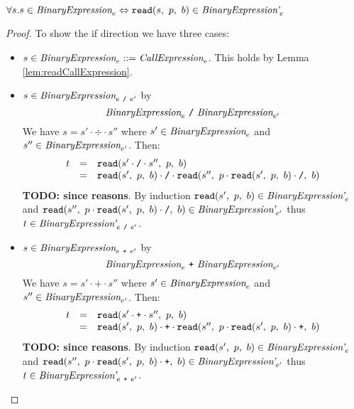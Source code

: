 \documentclass[preprint,10pt]{sigplanconf}
\begin{document}
\begin{lemma}\mbox{}
  
  \( \forall s. s \in \textit{BinaryExpression}_{e} \Leftrightarrow 
  \texttt{read}(s,~p,~b) \in \textit{BinaryExpression'}_{e} \)
\end{lemma}
\begin{proof}
  To show the if direction we have three cases:
  \begin{itemize}
  \item \( s \in \textit{BinaryExpression}_{e} ::=
    \textit{CallExpression}_{e} \). This holds by Lemma
    \ref{lem:readCallExpression}.

  \item \( s \in \textit{BinaryExpression}_{e~\texttt{/}~e'} \) by 
    \[
    \textit{BinaryExpression}_{e} ~\texttt{/}~ \textit{BinaryExpression}_{e'} 
    \]
    We have \( s = s' \cdot \div \cdot s'' \) where \( s' \in
    \textit{BinaryExpression}_{e} \) and \( s'' \in
    \textit{BinaryExpression}_{e'} \). Then:
    \[
    \begin{array}{rcl}
      t &=& \texttt{read}(s'\cdot \texttt{/} \cdot s'',~p,~b)
      \\
      &=& \texttt{read}(s',~p,~b) \cdot \texttt{/} \cdot 
      \texttt{read}(s'',~
        p \cdot \texttt{read}(s',~p,~b) \cdot \texttt{/}
      ,~b)
    \end{array}
    \]
    \textbf{TODO: since reasons}.
    By induction \( \texttt{read}(s',~p,~b) \in \textit{BinaryExpression'}_{e} \)
    and \( 
      \texttt{read}(s'',~
        p \cdot \texttt{read}(s',~p,~b) \cdot \texttt{/}
      ,~b) \in \textit{BinaryExpression'}_{e'}
      \) thus \( t \in \textit{BinaryExpression'}_{e~\texttt{/}~e'} \).

  \item \( s \in \textit{BinaryExpression}_{e~\texttt{+}~e'} \) by 
    \[
    \textit{BinaryExpression}_{e} ~\texttt{+}~ \textit{BinaryExpression}_{e'} 
    \]
    We have \( s = s' \cdot \texttt{+} \cdot s'' \) where \( s' \in
    \textit{BinaryExpression}_{e} \) and \( s'' \in
    \textit{BinaryExpression}_{e'} \). Then:
    \[
    \begin{array}{rcl}
      t &=& \texttt{read}(s'\cdot \texttt{+} \cdot s'',~p,~b)
      \\
      &=& \texttt{read}(s',~p,~b) \cdot \texttt{+} \cdot 
      \texttt{read}(s'',~
        p \cdot \texttt{read}(s',~p,~b) \cdot \texttt{+}
      ,~b)
    \end{array}
    \]
    \textbf{TODO: since reasons}.
    By induction \( \texttt{read}(s',~p,~b) \in \textit{BinaryExpression'}_{e} \)
    and \( 
      \texttt{read}(s'',~
        p \cdot \texttt{read}(s',~p,~b) \cdot \texttt{+}
      ,~b) \in \textit{BinaryExpression'}_{e'}
      \) thus \( t \in \textit{BinaryExpression'}_{e~\texttt{+}~e'} \).
  \end{itemize}
\end{proof}
\end{document}
